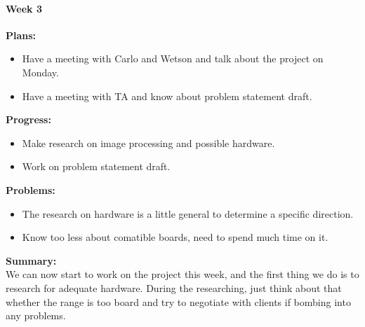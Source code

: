 \paragraph{Week 3}
\begin{adjustwidth}{2.5em}{0pt}
    \vspace{-0.5cm}\textbf{Plans:}
    \vspace{-0.5cm}
    \begin{itemize}
        \item Have a meeting with Carlo and Wetson and talk about the project on Monday.
        \item Have a meeting with TA and know about problem statement draft. 
    \end{itemize} 
    \vspace{-0.3cm}\textbf{Progress:}
    \vspace{-0.5cm}
    \begin{itemize}
        \item Make research on image processing and possible hardware. 
        \item Work on problem statement draft.
    \end{itemize} 
    \vspace{-0.3cm}\textbf{Problems:}
    \vspace{-0.5cm}
    \begin{itemize}
        \item The research on hardware is a little general to determine a specific direction.
        \item Know too less about comatible boards, need to spend much time on it.
    \end{itemize}  
    \vspace{-0.3cm}\noindent\textbf{Summary:}\\
    \noindent We can now start to work on the project this week, and the first thing we do is to research for 
    adequate hardware. During the researching, just think about that whether the range is too board and try 
    to negotiate with clients if bombing into any problems. \\
\end{adjustwidth} 

